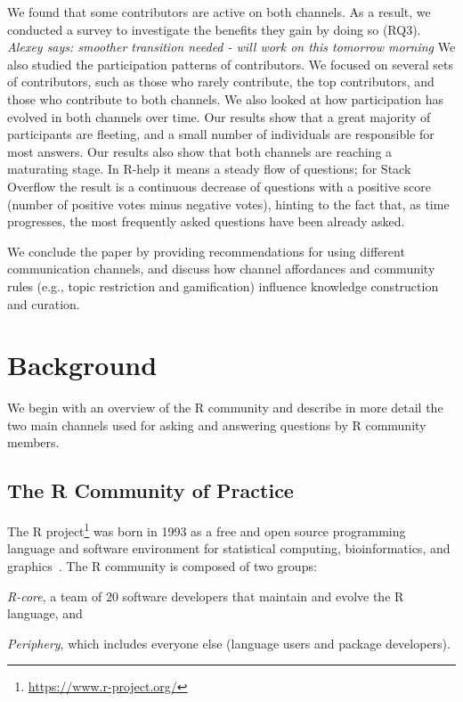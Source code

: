 \documentclass[smallextended]{svjour3}       %
\newcommand{\alexey}[1]{{\color{cyan}\emph{Alexey says: #1}}\xspace}
\newcommand{\alexey}[1]{}
\newcommand{\SO}{Stack Overflow\xspace}
\newcommand{\RH}{R-help\xspace}
\begin{document}
We found that some contributors are active on both channels. As a
result, we conducted a survey to investigate the benefits they gain by
doing so (RQ3). \alexey{smoother transition needed - will work on this tomorrow morning}
We also studied the participation patterns of contributors. We focused
on several sets of contributors, such as those who rarely contribute,
the top contributors, and those who contribute to both channels. We
also looked at how participation has evolved in both channels over
time. Our results show that a great majority of participants are
fleeting, and a small number of individuals are responsible for most
answers.  Our results also show that both channels are reaching a
maturating stage. In \RH it means a steady flow of questions; for \SO
the result is a continuous decrease of questions with a positive score
(number of positive votes minus negative votes), hinting to the fact
that, as time progresses, the most frequently asked questions have
been already asked.

We conclude the paper by providing recommendations for
using different communication channels, and discuss how channel
affordances and community rules (e.g., topic restriction and
gamification) influence knowledge construction and curation.

 \section{Background}
\label{cha:background}
We begin with an overview of the R community and describe in more detail the two main channels used for asking and answering questions by R community members.

\subsection{The R Community of Practice}
    
    The R project\footnote{\url{https://www.r-project.org/}} was born in 1993 as a free and open source programming language and software environment for statistical computing, bioinformatics, and graphics~\cite{Ihaka1996}.
    The R community is composed of two groups:
    \begin{enumerate*}[label=(\arabic*)]
      \item \textit{R-core}, a team of 20 software developers that maintain and evolve the R language, and
      \item \textit{Periphery}, which includes everyone else (language users and package developers).
    \end{enumerate*}
\end{document}
